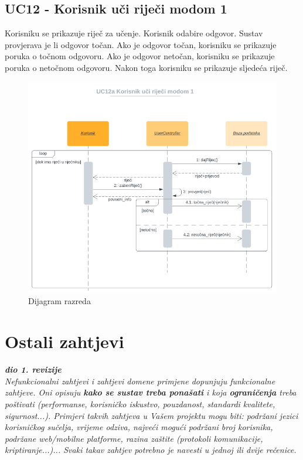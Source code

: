 				\subsection*{UC12 - Korisnik uči riječi modom 1}

				Korisniku se prikazuje riječ za učenje. Korisnik odabire odgovor. Sustav provjerava je li odgovor točan. Ako je odgovor točan, korisniku se prikazuje poruka o točnom odgovoru. Ako je odgovor netočan, korisniku se prikazuje poruka o netočnom odgovoru. Nakon toga korisniku se prikazuje sljedeća riječ.\\

				\begin{figure}[H]
					\includegraphics[scale=0.5]{dijagrami/UC12.png} 
					\centering
					\caption{Dijagram razreda}
					\label{fig:class_diagram}
				\end{figure}	
				\eject
	
		\section{Ostali zahtjevi}
		
			\textbf{\textit{dio 1. revizije}}\\
		 
			 \textit{Nefunkcionalni zahtjevi i zahtjevi domene primjene dopunjuju funkcionalne zahtjeve. Oni opisuju \textbf{kako se sustav treba ponašati} i koja \textbf{ograničenja} treba poštivati (performanse, korisničko iskustvo, pouzdanost, standardi kvalitete, sigurnost...). Primjeri takvih zahtjeva u Vašem projektu mogu biti: podržani jezici korisničkog sučelja, vrijeme odziva, najveći mogući podržani broj korisnika, podržane web/mobilne platforme, razina zaštite (protokoli komunikacije, kriptiranje...)... Svaki takav zahtjev potrebno je navesti u jednoj ili dvije rečenice.}
			 
			 
			 
	